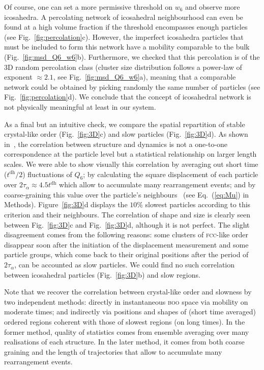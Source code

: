 Of course, one can set a more permissive threshold on $w_6$ and observe more icosahedra. A percolating network of icosahedral neighbourhood can even be found at a high volume fraction if the threshold encompasses enough particles (see Fig.~\ref{fig:percolation}c). However, the imperfect icosahedra particles that must be included to form this network have a mobility comparable to the bulk (Fig.~\ref{fig:msd_Q6_w6}b). Furthermore, we checked that this percolation is of the 3D random percolation class (cluster size distribution follows a power-law of exponent $\approx 2.1$, see Fig.~\ref{fig:msd_Q6_w6}a), meaning that a comparable network could be obtained by picking randomly the same number of particles (see Fig.~\ref{fig:percolation}d). We conclude that the concept of icosahedral network is not physically meaningful at least in our system.

As a final but an intuitive check, we compare the spatial repartition of stable crystal-like order (Fig.~\ref{fig:3D}c) and slow particles (Fig.~\ref{fig:3D}d). As shown in~\citep{Berthier2007}, the correlation between structure and dynamics is not a one-to-one correspondence at the particle level but a statistical relationship on larger length scales. We were able to show visually this correlation by averaging out short time ($t^\text{dh}/2$) fluctuations of $Q_6$; by calculating the square displacement of each particle over $2\tau_\alpha\approx 4.5t^\text{dh}$ which allow to accumulate many rearrangement events; and by coarse-graining this value over the particle's neighbours~\citep{Berthier2007} (see Eq.~(\ref{eq:Mu}) in Methods). Figure~\ref{fig:3D}d displays the $10\%$ slowest particles according to this criterion and their neighbours. The correlation of shape and size is clearly seen between Fig.~\ref{fig:3D}c and Fig.~\ref{fig:3D}d, although it is not perfect. The slight disagreement comes from the following reasons: some clusters of \textsc{fcc}-like order disappear soon after the initiation of the displacement measurement and some particle groups, which come back to their original positions after the period of $2\tau_\alpha$, can be accounted as slow particles. We could find no such correlation between icosahedral particles (Fig.~\ref{fig:3D}b) and slow regions.

Note that we recover the correlation between crystal-like order and slowness by two independent methods: directly in instantaneous \textsc{boo} space via mobility on moderate times; and indirectly via positions and shapes of (short time averaged) ordered regions coherent with those of slowest regions (on long times). In the former method, quality of statistics comes from ensemble averaging over many realisations of each structure. In the later method, it comes from both coarse graining and the length of trajectories that allow to accumulate many rearrangement events.


